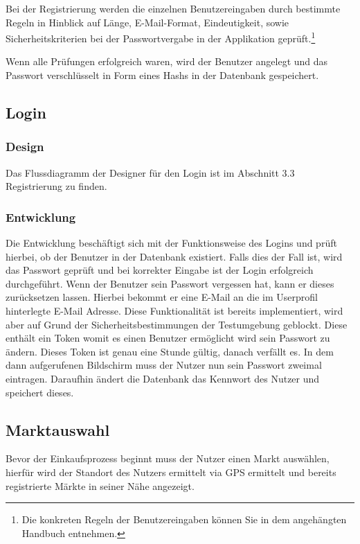 \documentclass[12pt,a4paper]{article}
\begin{document}
Bei der Registrierung werden die einzelnen Benutzereingaben durch bestimmte Regeln in Hinblick auf Länge, E-Mail-Format, Eindeutigkeit, sowie Sicherheitskriterien bei der Passwortvergabe in der Applikation geprüft.\footnote{Die konkreten Regeln der Benutzereingaben können Sie in dem angehängten Handbuch entnehmen.}

Wenn alle Prüfungen erfolgreich waren, wird der Benutzer angelegt und das Passwort verschlüsselt in Form eines Hashs in der Datenbank gespeichert.
\newpage
\subsection{Login}
\subsubsection*{Design}
Das Flussdiagramm der Designer für den Login ist im Abschnitt 3.3 Registrierung zu finden. 
\subsubsection*{Entwicklung}
Die Entwicklung beschäftigt sich mit der Funktionsweise des Logins und prüft hierbei, ob der Benutzer in der Datenbank existiert. Falls dies der Fall ist, wird das Passwort geprüft und bei korrekter Eingabe ist der Login erfolgreich durchgeführt.
Wenn der Benutzer sein Passwort vergessen hat, kann er dieses zurücksetzen lassen. Hierbei bekommt er eine E-Mail an die im Userprofil hinterlegte E-Mail Adresse. Diese Funktionalität ist bereits implementiert, wird aber auf Grund der Sicherheitsbestimmungen der Testumgebung geblockt. Diese enthält ein Token womit es einen Benutzer ermöglicht wird sein Passwort zu ändern. Dieses Token ist genau eine Stunde gültig, danach verfällt es. 
In dem dann aufgerufenen Bildschirm muss der Nutzer nun sein Passwort zweimal eintragen. Daraufhin ändert die Datenbank das Kennwort des Nutzer und speichert dieses.
\newpage
\subsection{Marktauswahl}
Bevor der Einkaufsprozess beginnt muss der Nutzer einen Markt auswählen, hierfür wird der Standort des Nutzers ermittelt via GPS ermittelt und bereits registrierte Märkte in seiner Nähe angezeigt. 
\end{document}
